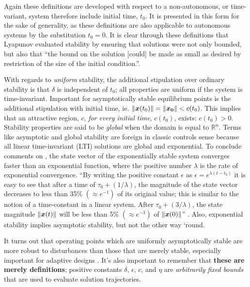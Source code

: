 \documentclass[12pt]{ucthesis}
\begin{document}
Again these definitions are developed with respect to a non-autonomous, or time-variant, system therefore include initial time, $t_0$. It is presented in this form for the sake of generality, as these definitions are also applicable to autonomous systems by the substitution $t_0 = 0$. It is clear through these definitions that Lyapunov evaluated stability by ensuring that solutions were not only bounded, but also that ``the bound on the solution [could] be made as small as desired by restriction of the size of the initial condition.''\citep{Farrell2006}. 

With regards to \textit{uniform} stability, the additional stipulation over ordinary stability is that $\delta$ is independent of $t_0$; all properties are uniform if the system is time-invariant. Important for asymptotically stable equilibrium points is the additional stipulation with initial time, ie. $\| \boldsymbol{x}(t_0)\|  = \| \boldsymbol{x_0}\|  < c(t_0)$. This implies that an attractive region, $c$, \textit{for every initial time}, $c(t_0)$, exists: $c(t_0)>0$. Stability properties are said to be \textit{global} when the domain is equal to $\mathbb{R}^n$. Terms like asymptotic and global stability are foreign in classic controls sense because all linear time-invariant (LTI) solutions are global and exponential. To conclude comments on , the state vector of the exponentially stable system converges faster than an exponential function, where the positive number $\lambda$ is the rate of exponential convergence. ``By writing the positive constant $\epsilon$ as $\epsilon=e^{\lambda(t-t_0)}$ it is easy to see that after a time of $\tau_0 + (1/\lambda)$, the magnitude of the state vector decreases to less than 35\% $(\approx e^{-1})$ of its original value; this is similar to the notion of a time-constant in a linear system. After $\tau_0 + (3/\lambda)$, the state magnitude $\lVert \boldsymbol{x}(t) \rVert$ will be less than 5\% $(\approx e^{-3})$ of $\lVert \boldsymbol{x}(0) \rVert$'' \citep{Slotine1991}. Also, exponential stability implies asymptotic stability, but not the other way `round. 

It turns out that operating points which are uniformly asymptotically stable are more robust to disturbances than those that are merely stable, especially important for adaptive designs \citep[Sec. 2.1]{Khalil1996}. It's also important to remember that \textbf{these are merely definitions}; positive constants $\delta$, $\epsilon$, $c$, and $\eta$ are \textit{arbitrarily fixed bounds} that are used to evaluate solution trajectories.
\end{document}

